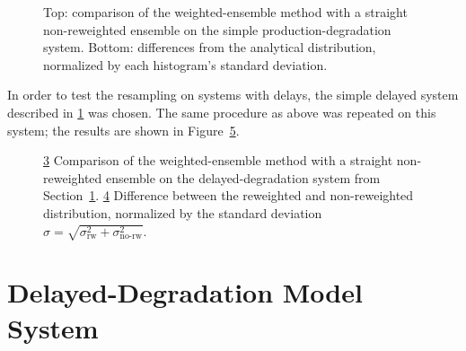 \documentclass[english,letterpaper,12pt]{article}
\begin{document}
\begin{doublespacing}
\begin{figure}[hp]
\begin{center}
        \begin{subfigure}{\textwidth}
            
            \label{sfg:gaussvf-chi}
        \end{subfigure}
    \end{center}
    \caption{Top: comparison of the weighted-ensemble method with a straight non-reweighted ensemble on the simple production-degradation system. Bottom: differences from the analytical distribution, normalized by each histogram's standard deviation.}
    \label{fig:gaussian-verification}
\end{figure}

In order to test the resampling on systems with delays, the simple delayed system described in \ref{sec:delayed-deg} was chosen. The same procedure as above was repeated on this system; the results are shown in Figure~\ref{fig:dd-verification}. 

\begin{figure}[ht]
    \begin{center}
        \begin{subfigure}{0.49\textwidth}
            \resizebox{\textwidth}{!}{
                
            }
            \caption{}
            \label{sfg:ddvf-comparison}
        \end{subfigure}
        \begin{subfigure}{0.49\textwidth}
            \resizebox{\textwidth}{!}{
                
            }
            \caption{}
            \label{sfg:ddvf-chi}
        \end{subfigure}
    \end{center}
    \caption{\ref{sfg:ddvf-comparison} Comparison of the weighted-ensemble method with a straight non-reweighted ensemble on the delayed-degradation system from Section~\ref{sec:delayed-deg}. \ref{sfg:ddvf-chi} Difference between the reweighted and non-reweighted distribution, normalized by the standard deviation $\sigma = \sqrt{\sigma_\text{rw}^2 + \sigma_\text{no-rw}^2}$.}
    \label{fig:dd-verification}
\end{figure}



\section{Delayed-Degradation Model System} %
\label{sec:delayed-deg}


\end{doublespacing}
\end{document}
